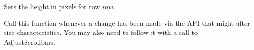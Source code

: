 \label{wxgridsetrowheight}


Sets the height in pixels for row {\it row}.

\label{wxgridupdatedimensions}


Call this function whenever a change has been made via the API that
might alter size characteristics. You may also need to follow it with
a call to AdjustScrollbars.

